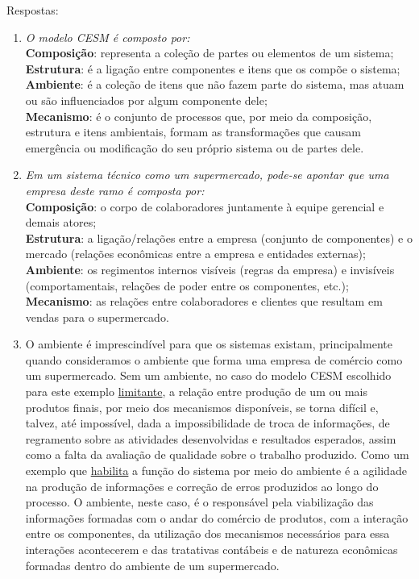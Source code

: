 \documentclass{article}
\begin{document}
Respostas:
\begin{enumerate}
    \item \textit{O modelo CESM é composto por:}\\
        \textbf{Composição}: representa a coleção de partes ou elementos de um sistema;\\
        \textbf{Estrutura}: é a ligação entre componentes e itens que os compõe o sistema;\\
        \textbf{Ambiente}: é a coleção de itens que não fazem parte do sistema, mas atuam ou são influenciados por algum componente dele;\\
        \textbf{Mecanismo}: é o conjunto de processos que, por meio da composição, estrutura e itens ambientais, formam as transformações que causam emergência ou modificação do seu próprio sistema ou de partes dele.
    \item \textit{Em um sistema técnico como um supermercado, pode-se apontar que uma empresa deste ramo é composta por:}\\
        \textbf{Composição}: o corpo de colaboradores juntamente à equipe gerencial e demais atores;\\
        \textbf{Estrutura}: a ligação/relações entre a empresa (conjunto de componentes) e o mercado (relações econômicas entre a empresa e entidades externas);\\
        \textbf{Ambiente}: os regimentos internos visíveis (regras da empresa) e invisíveis (comportamentais, relações de poder entre os componentes, etc.);\\
        \textbf{Mecanismo}: as relações entre colaboradores e clientes que resultam em vendas para o supermercado.
    \item O ambiente é imprescindível para que os sistemas existam, principalmente quando consideramos o ambiente que forma uma empresa de comércio como um supermercado. Sem um ambiente, no caso do modelo CESM escolhido para este exemplo \underline{limitante}, a relação entre produção de um ou mais produtos finais, por meio dos mecanismos disponíveis, se torna difícil e, talvez, até impossível, dada a impossibilidade de troca de informações, de regramento sobre as atividades desenvolvidas e resultados esperados, assim como a falta da avaliação de qualidade sobre o trabalho produzido. Como um exemplo que \underline{habilita} a função do sistema por meio do ambiente é a agilidade na produção de informações e correção de erros produzidos ao longo do processo. O ambiente, neste caso, é o responsável pela viabilização das informações formadas com o andar do comércio de produtos, com a interação entre os componentes, da utilização dos mecanismos necessários para essa interações acontecerem e das tratativas contábeis e de natureza econômicas formadas dentro do ambiente de um supermercado.

\end{enumerate}
\end{document}
